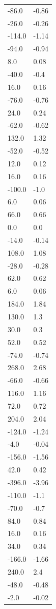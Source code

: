 \begin{longtable}{ll}
-86.0 & -0.86 \\
-26.0 & -0.26 \\
-114.0 & -1.14 \\
-94.0 & -0.94 \\
8.0 & 0.08 \\
-40.0 & -0.4 \\
16.0 & 0.16 \\
-76.0 & -0.76 \\
24.0 & 0.24 \\
-62.0 & -0.62 \\
132.0 & 1.32 \\
-52.0 & -0.52 \\
12.0 & 0.12 \\
16.0 & 0.16 \\
-100.0 & -1.0 \\
6.0 & 0.06 \\
66.0 & 0.66 \\
0.0 & 0.0 \\
-14.0 & -0.14 \\
108.0 & 1.08 \\
-28.0 & -0.28 \\
62.0 & 0.62 \\
6.0 & 0.06 \\
184.0 & 1.84 \\
130.0 & 1.3 \\
30.0 & 0.3 \\
52.0 & 0.52 \\
-74.0 & -0.74 \\
268.0 & 2.68 \\
-66.0 & -0.66 \\
116.0 & 1.16 \\
72.0 & 0.72 \\
204.0 & 2.04 \\
-124.0 & -1.24 \\
-4.0 & -0.04 \\
-156.0 & -1.56 \\
42.0 & 0.42 \\
-396.0 & -3.96 \\
-110.0 & -1.1 \\
-70.0 & -0.7 \\
84.0 & 0.84 \\
16.0 & 0.16 \\
34.0 & 0.34 \\
-166.0 & -1.66 \\
240.0 & 2.4 \\
-48.0 & -0.48 \\
-2.0 & -0.02 \\

\end{longtable}

